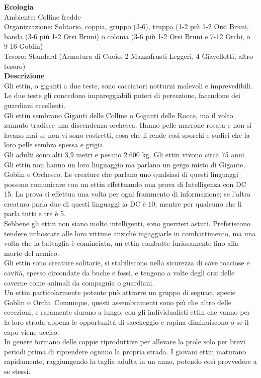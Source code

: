 \begin{multicols}{2}
\textbf{Ecologia}\\
Ambiente: Colline fredde\\
Organizzazione: Solitario, coppia, gruppo (3-6), truppa (1-2 più 1-2 Orsi Bruni, banda (3-6 più 1-2 Orsi Bruni) o colonia (3-6 più 1-2 Orsi Bruni e 7-12 Orchi, o 9-16 Goblin)\\
Tesoro: Standard (Armatura di Cuoio, 2 Mazzafrusti Leggeri, 4 Giavellotti, altro tesoro)\\
\textbf{Descrizione}\\
Gli ettin, o giganti a due teste, sono cacciatori notturni malevoli e imprevedibili. Le due teste gli concedono impareggiabili poteri di percezione, facendone dei guardiani eccellenti.\\
Gli ettin sembrano Giganti delle Colline o Giganti delle Rocce, ma il volto zannuto tradisce una discendenza orchesca. Hanno pelle marrone rosata e non si lavano mai se non vi sono costretti, cosa che li rende così sporchi e sudici che la loro pelle sembra spessa e grigia.\\
Gli adulti sono alti 3,9 metri e pesano 2.600 kg. Gli ettin vivono circa 75 anni.\\
Gli ettin non hanno un loro linguaggio ma parlano un gergo misto di Gigante, Goblin e Orchesco. Le creature che parlano uno qualsiasi di questi linguaggi possono comunicare con un ettin effettuando una prova di Intelligenza con DC 15. La prova si effettua una volta per ogni frammento di informazione; se l'altra creatura parla due di questi linguaggi la DC è 10, mentre per qualcuno che li parla tutti e tre è 5.\\
Sebbene gli ettin non siano molto intelligenti, sono guerrieri astuti. Preferiscono tendere imboscate alle loro vittime anziché ingaggiarle in combattimento, ma una volta che la battaglia è cominciata, un ettin combatte furiosamente fino alla morte del nemico.\\
Gli ettin sono creature solitarie, si stabiliscono nella sicurezza di cave rocciose e cavità, spesso circondate da buche e fossi, e tengono a volte degli orsi delle caverne come animali da compagnia o guardiani.\\
Un ettin particolarmente potente può attrarre un gruppo di seguaci, specie Goblin o Orchi. Comunque, questi assembramenti sono più che altro delle eccezioni, e raramente durano a lungo, con gli individualisti ettin che vanno per la loro strada appena le opportunità di saccheggio e rapina diminuiscono o se il capo viene ucciso.\\
In genere formano delle coppie riproduttive per allevare la prole solo per brevi periodi prima di riprendere ognuno la propria strada. I giovani ettin maturano rapidamente, raggiungendo la taglia adulta in un anno, potendo così provvedere a se stessi.\\


\end{multicols}
